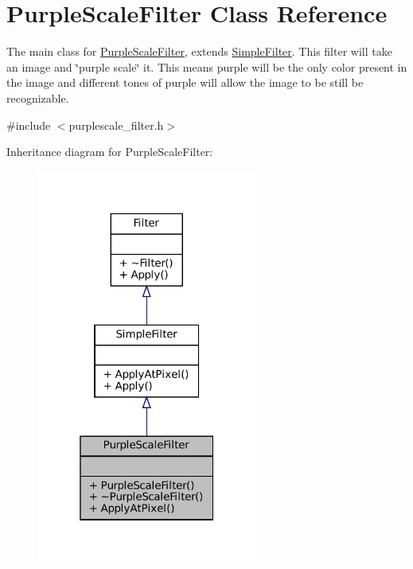 \hypertarget{classPurpleScaleFilter}{}\section{Purple\+Scale\+Filter Class Reference}
\label{classPurpleScaleFilter}


The main class for \hyperlink{classPurpleScaleFilter}{Purple\+Scale\+Filter}, extends \hyperlink{classSimpleFilter}{Simple\+Filter}. This filter will take an image and \char`\"{}purple scale\char`\"{} it. This means purple will be the only color present in the image and different tones of purple will allow the image to be still be recognizable.  




{\ttfamily \#include $<$purplescale\+\_\+filter.\+h$>$}



Inheritance diagram for Purple\+Scale\+Filter\+:\nopagebreak
\begin{figure}[H]
\begin{center}
\leavevmode
\includegraphics[width=205pt]{classPurpleScaleFilter__inherit__graph}
\end{center}
\end{figure}


